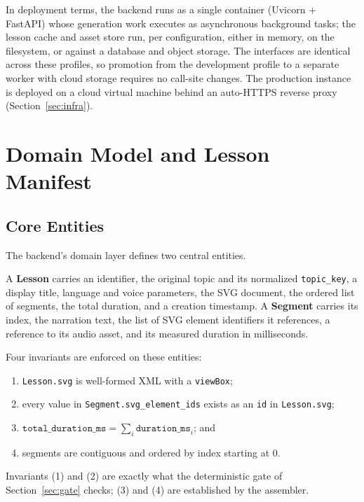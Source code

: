 In deployment terms, the backend runs as a single container (Uvicorn +
FastAPI) whose generation work executes as asynchronous background tasks; the
lesson cache and asset store run, per configuration, either in memory, on the
filesystem, or against a database and object storage. The interfaces are
identical across these profiles, so promotion from the development profile to
a separate worker with cloud storage requires no call-site changes. The
production instance is deployed on a cloud virtual machine behind an
auto-HTTPS reverse proxy (Section~\ref{sec:infra}).

\section{Domain Model and Lesson Manifest}
\label{sec:domainmodel}

\subsection{Core Entities}

The backend's domain layer defines two central entities.

A \textbf{Lesson} carries an identifier, the original topic and its
normalized \texttt{topic\_key}, a display title, language and voice
parameters, the SVG document, the ordered list of segments, the total
duration, and a creation timestamp. A \textbf{Segment} carries its index, the
narration text, the list of SVG element identifiers it references, a
reference to its audio asset, and its measured duration in milliseconds.

Four invariants are enforced on these entities:

\begin{enumerate}
  \item \texttt{Lesson.svg} is well-formed XML with a \texttt{viewBox};
  \item every value in \texttt{Segment.svg\_element\_ids} exists as an
        \texttt{id} in \texttt{Lesson.svg};
  \item $\texttt{total\_duration\_ms} = \sum_i \texttt{duration\_ms}_i$; and
  \item segments are contiguous and ordered by index starting at 0.
\end{enumerate}

Invariants (1) and (2) are exactly what the deterministic gate of
Section~\ref{sec:gate} checks; (3) and (4) are established by the assembler.

